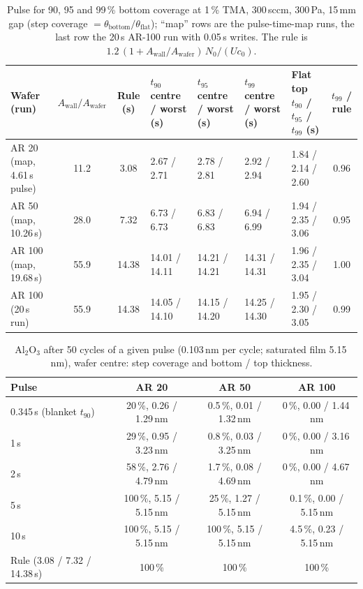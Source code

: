 \documentclass[11pt,letterpaper]{article}
\newcommand{\Awall}{A_{\mathrm{wall}}/A_{\mathrm{wafer}}}
\begin{document}
\begin{table}[tbp]
\centering
\caption{Pulse for 90, 95 and 99\,\% bottom coverage at 1\,\% TMA, 300\,sccm, 300\,Pa, 15\,mm gap (step coverage $= \theta_{\mathrm{bottom}}/\theta_{\mathrm{flat}}$); ``map'' rows are the pulse-time-map runs, the last row the 20\,s AR-100 run with 0.05\,s writes. The rule is $1.2\,(1 + \Awall)\,N_0/(U c_0)$.}
\label{tab:stepcov}
\footnotesize
\setlength{\tabcolsep}{4pt}
\begin{tabular}{P{0.95in}ccP{0.7in}P{0.7in}P{0.7in}P{0.88in}c}
\toprule
Wafer (run) & $\Awall$ & Rule (s) & $t_{90}$ centre / worst (s) & $t_{95}$ centre / worst (s) & $t_{99}$ centre / worst (s) & Flat top $t_{90}$ / $t_{95}$ / $t_{99}$ (s) & $t_{99}$ / rule \\
\midrule
AR 20 (map, 4.61\,s pulse) & 11.2 & 3.08 & 2.67 / 2.71 & 2.78 / 2.81 & 2.92 / 2.94 & 1.84 / 2.14 / 2.60 & 0.96 \\
AR 50 (map, 10.26\,s) & 28.0 & 7.32 & 6.73 / 6.73 & 6.83 / 6.83 & 6.94 / 6.99 & 1.94 / 2.35 / 3.06 & 0.95 \\
AR 100 (map, 19.68\,s) & 55.9 & 14.38 & 14.01 / 14.11 & 14.21 / 14.21 & 14.31 / 14.31 & 1.96 / 2.35 / 3.04 & 1.00 \\
AR 100 (20\,s run) & 55.9 & 14.38 & 14.05 / 14.10 & 14.15 / 14.20 & 14.25 / 14.30 & 1.95 / 2.30 / 3.05 & 0.99 \\
\bottomrule
\end{tabular}
\end{table}

\begin{table}[tbp]
\centering
\caption{Al$_2$O$_3$ after 50 cycles of a given pulse (0.103\,nm per cycle; saturated film 5.15\,nm), wafer centre: step coverage and bottom / top thickness.}
\label{tab:film}
\footnotesize
\begin{tabular}{lccc}
\toprule
Pulse & AR 20 & AR 50 & AR 100 \\
\midrule
0.345\,s (blanket $t_{90}$) & 20\,\%, 0.26 / 1.29\,nm & 0.5\,\%, 0.01 / 1.32\,nm & 0\,\%, 0.00 / 1.44\,nm \\
1\,s & 29\,\%, 0.95 / 3.23\,nm & 0.8\,\%, 0.03 / 3.25\,nm & 0\,\%, 0.00 / 3.16\,nm \\
2\,s & 58\,\%, 2.76 / 4.79\,nm & 1.7\,\%, 0.08 / 4.69\,nm & 0\,\%, 0.00 / 4.67\,nm \\
5\,s & 100\,\%, 5.15 / 5.15\,nm & 25\,\%, 1.27 / 5.15\,nm & 0.1\,\%, 0.00 / 5.15\,nm \\
10\,s & 100\,\%, 5.15 / 5.15\,nm & 100\,\%, 5.15 / 5.15\,nm & 4.5\,\%, 0.23 / 5.15\,nm \\
Rule (3.08 / 7.32 / 14.38\,s) & 100\,\% & 100\,\% & 100\,\% \\
\bottomrule
\end{tabular}
\end{table}
\end{document}

